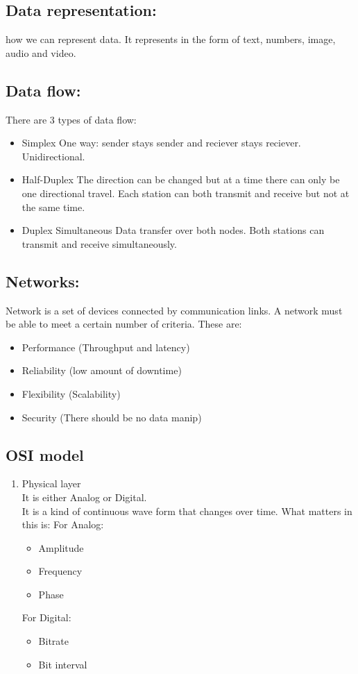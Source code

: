 \documentclass[11pt,letterpaper]{article}
\begin{document}
\subsection{Data representation:}
how we can represent data. It represents in the form of text, numbers, image, audio and video. 

\subsection{Data flow:}
There are 3 types of data flow: 
\begin{itemize}
\item Simplex
 	One way: sender stays sender and reciever stays reciever. 
	Unidirectional. 
\item Half-Duplex
	The direction can be changed but at a time there can only be one directional travel.
	Each station can both transmit and receive but not at the  same time. 
\item Duplex
	Simultaneous Data transfer over both nodes. 
	Both stations can transmit and receive simultaneously. 
\end{itemize}

\subsection{Networks:}
Network is a set of devices connected by communication links. A network must be able to meet a certain number of criteria. These are:
\begin{itemize}
  \item Performance (Throughput and latency)
  \item Reliability (low amount of downtime)
  \item Flexibility (Scalability)
  \item Security    (There should be no data manip)
\end{itemize}

\subsection{OSI model}
\begin{enumerate}
  \item Physical layer\\
    It is either Analog or Digital.\\
    It is a kind of continuous wave form that changes over time. 
    What matters in this is:
    For Analog:
    \begin{itemize}
      \item Amplitude
      \item Frequency
      \item Phase
    \end{itemize}
    For Digital:
    \begin{itemize}
      \item Bitrate
      \item Bit interval
    \end{itemize}
\end{enumerate}
\end{document}
